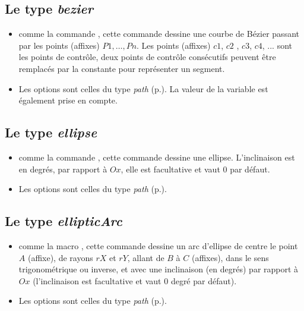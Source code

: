 \subsection{Le type \emph{bezier}}\label{typebezier}

{\centering {}\par}

\begin{itemize}
 \item \desc comme la commande , cette commande dessine une courbe de Bézier passant par les points (affixes) $P1,\ldots,Pn$. Les points (affixes) $c1$, $c2$ , $c3$, $c4$, ... sont les points de contrôle, deux points de contrôle consécutifs peuvent être remplacés par la constante \jump pour représenter un segment. 
 \item Les options sont celles du type \emph{path} (p.\pageref{typepath}). La valeur de la variable  est également prise en compte.
\end{itemize}

\subsection{Le type \emph{ellipse}}\label{typeellipse}

{\centering {}\par}

\begin{itemize}
 \item \desc comme la commande , cette commande dessine une ellipse. L'inclinaison est en degrés, par rapport à $Ox$, elle est facultative et vaut $0$ par défaut. 
 \item Les options sont celles du type \emph{path} (p.\pageref{typepath}).
\end{itemize}

\subsection{Le type \emph{ellipticArc}}\label{typeellipticArc}

{\centering {}\par}

\begin{itemize}
 \item \desc comme la macro , cette commande dessine un arc d'ellipse de centre le point $A$ (affixe), de rayons $rX$ et $rY$, allant de $B$ à $C$ (affixes), dans le sens trigonométrique ou inverse, et avec une inclinaison (en degrés) par rapport à $Ox$ (l'inclinaison est facultative et vaut $0$ degré par défaut). 
 \item Les options sont celles du type \emph{path} (p.\pageref{typepath}).
\end{itemize}

